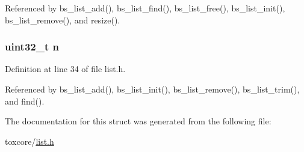 Referenced by bs\+\_\+list\+\_\+add(), bs\+\_\+list\+\_\+find(), bs\+\_\+list\+\_\+free(), bs\+\_\+list\+\_\+init(), bs\+\_\+list\+\_\+remove(), and resize().

\hypertarget{struct_b_s___l_i_s_t_a3d8a9527a2ee4a7ebf59175650142e75}{
\subsubsection[{n}]{\setlength{\rightskip}{0pt plus 5cm}uint32\+\_\+t n}}\label{struct_b_s___l_i_s_t_a3d8a9527a2ee4a7ebf59175650142e75}


Definition at line 34 of file list.\+h.



Referenced by bs\+\_\+list\+\_\+add(), bs\+\_\+list\+\_\+init(), bs\+\_\+list\+\_\+remove(), bs\+\_\+list\+\_\+trim(), and find().



The documentation for this struct was generated from the following file\+:\begin{DoxyCompactItemize}
\item 
toxcore/\hyperlink{list_8h}{list.\+h}\end{DoxyCompactItemize}
